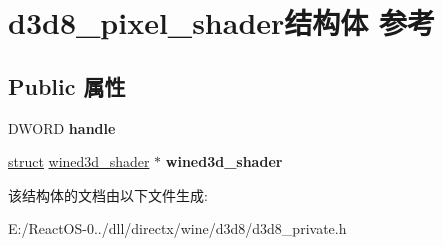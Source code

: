 \hypertarget{structd3d8__pixel__shader}{}\section{d3d8\+\_\+pixel\+\_\+shader结构体 参考}
\label{structd3d8__pixel__shader}
\subsection*{Public 属性}
\begin{DoxyCompactItemize}
\item 
\mbox{\label{structd3d8__pixel__shader_a4f6cf557e4df6fd1b78c1eb30c9c68fc}} 
D\+W\+O\+RD {\bfseries handle}
\item 
\mbox{\label{structd3d8__pixel__shader_a8b8011aea5f4514ed064742779c47a2f}} 
\hyperlink{interfacestruct}{struct} \hyperlink{structwined3d__shader}{wined3d\+\_\+shader} $\ast$ {\bfseries wined3d\+\_\+shader}
\end{DoxyCompactItemize}


该结构体的文档由以下文件生成\+:\begin{DoxyCompactItemize}
\item 
E\+:/\+React\+O\+S-\/0../dll/directx/wine/d3d8/d3d8\+\_\+private.\+h\end{DoxyCompactItemize}
